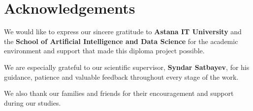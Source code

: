 \chapter*{Acknowledgements}

We would like to express our sincere gratitude to \textbf{Astana IT University} and the \textbf{School of Artificial Intelligence and Data Science} for the academic environment and support that made this diploma project possible.

We are especially grateful to our scientific supervisor, \textbf{Syndar Satbayev}, for his guidance, patience and valuable feedback throughout every stage of the work.

We also thank our families and friends for their encouragement and support during our studies.
